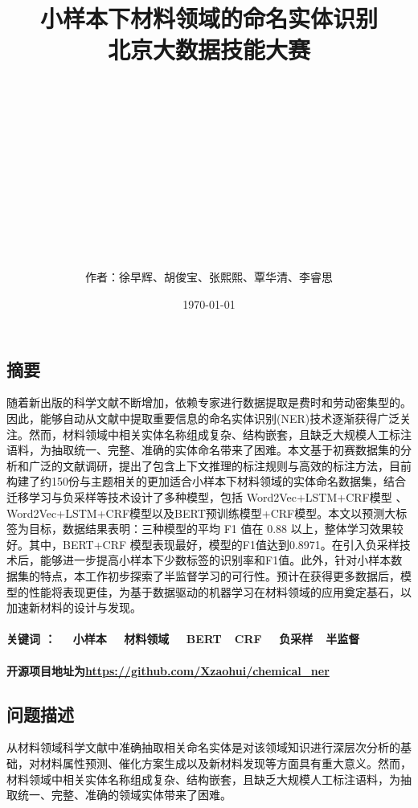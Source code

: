\documentclass{article}
\title{小样本下材料领域的命名实体识别\\ {\small 北京大数据技能大赛}}
\author{\\\\\\\\\\\\\\\\\\\\\\\\作者：徐早辉、胡俊宝、张熙熙、覃华清、李睿思}
\date{\today}
\begin{document}
	\maketitle
	\newpage
	\begin{center}
		\tableofcontents
	\end{center}
	
	\newpage
	\begin{center}
		\section{摘要}
	\end{center}
	
	
	随着新出版的科学文献不断增加，依赖专家进行数据提取是费时和劳动密集型的。因此，能够自动从文献中提取重要信息的命名实体识别(NER)技术逐渐获得广泛关注。然而，材料领域中相关实体名称组成复杂、结构嵌套，且缺乏大规模人工标注语料，为抽取统一、完整、准确的实体命名带来了困难。本文基于初赛数据集的分析和广泛的文献调研，提出了包含上下文推理的标注规则与高效的标注方法，目前构建了约150份与主题相关的更加适合小样本下材料领域的实体命名数据集，结合迁移学习与负采样等技术设计了多种模型，包括 Word2Vec+LSTM+CRF模型 、 Word2Vec+LSTM+CRF模型以及BERT预训练模型+CRF模型。本文以预测大标签为目标，数据结果表明：三种模型的平均 F1 值在 0.88 以上，整体学习效果较好。其中，BERT+CRF 模型表现最好，模型的F1值达到0.8971。在引入负采样技术后，能够进一步提高小样本下少数标签的识别率和F1值。此外，针对小样本数据集的特点，本工作初步探索了半监督学习的可行性。预计在获得更多数据后，模型的性能将表现更佳，为基于数据驱动的机器学习在材料领域的应用奠定基石，以加速新材料的设计与发现。
\paragraph{关键词 ： ~~小样本 ~~材料领域  ~~BERT~~CRF ~~负采样~~半监督}
	
\paragraph{开源项目地址为\url{https://github.com/Xzaohui/chemical_ner}}
	\newpage
	\begin{center}
		\section{问题描述}
	\end{center}
	
	
	从材料领域科学文献中准确抽取相关命名实体是对该领域知识进行深层次分析的基础，对材料属性预测、催化方案生成以及新材料发现等方面具有重大意义。然而，材料领域中相关实体名称组成复杂、结构嵌套，且缺乏大规模人工标注语料，为抽取统一、完整、准确的领域实体带来了困难。
	
\end{document}
